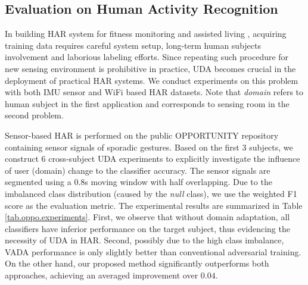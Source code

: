 \subsection{Evaluation on Human Activity Recognition}
In building HAR system for fitness monitoring and assisted living \cite{mohr2017personal,song2018optimizing}, acquiring training data requires careful system setup, long-term human subjects involvement and laborious labeling efforts. Since repeating such procedure for new sensing environment is prohibitive in practice, UDA becomes crucial in the deployment of practical HAR systems. We conduct experiments on this problem with both IMU sensor and WiFi based HAR datasets. Note that \textit{domain} refers to human subject in the first application and corresponds to sensing room in the second problem. 




Sensor-based HAR is performed on the public OPPORTUNITY repository containing sensor signals of sporadic gestures. Based on the first $3$ subjects, we construct $6$ cross-subject UDA experiments to explicitly investigate the influence of user (domain) change to the classifier accuracy. The sensor signals are segmented using a $0.8$s moving window with half overlapping. Due to the imbalanced class distribution (caused by the \textit{null} class), we use the weighted F1 score as the evaluation metric. The experimental results are summarized in Table \ref{tab.oppo.experiments}. First, we observe that without domain adaptation, all classifiers have inferior performance on the target subject, thus evidencing the necessity of UDA in HAR. Second, possibly due to the high class imbalance, VADA performance is only slightly better than conventional adversarial training. On the other hand, our proposed method significantly outperforms both approaches, achieving an averaged improvement over $0.04$.





\begin{table}[t]
\centering
{}
\caption{Ablation experiments for STL $\rightarrow$ CIFAR and OPPORTUNITY 1 $\rightarrow$ 2 tasks. Each row corresponds to adding the specified component(s) to the previous row.}
\label{tab.visual-domain.ablation.experiments}
\end{table}









